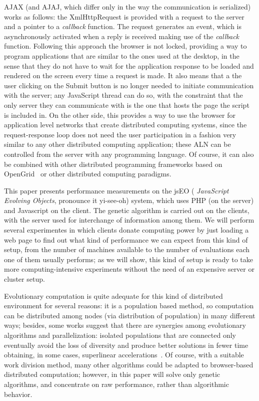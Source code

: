 \documentclass{llncs}
\begin{document}
AJAX (and AJAJ, which differ only in the way the communication is
serialized) works as follows: the {\sf XmlHttpRequest} is provided 
with a request to the server and a pointer to a {\em callback} function. 
The request generates an event, which is asynchronously activated when a
reply is received  making use of the
 {\em callback} function. 
Following this approach the browser is not locked, providing a way to
program applications that are similar to  the ones used at the
desktop, in the sense that they do not have to wait for the
application response to be loaded
and rendered on the screen every time a request is made. It also means
that a the user clicking on the {\sf Submit} button is no longer
needed to initiate communication with the server; any JavaScript
thread can do so, with the constraint that the only server they can
communicate with is the one that hosts the page the script is included
in. On the other side, this provides a way to use the browser for application
level networks that create distributed computing systems,
since the request-response loop does not need the user participation in a
fashion very similar  to any other distributed computing application;
these ALN can be controlled from the server with any programming
language. Of course, it can also be combined with other distributed
programming frameworks based on OpenGrid~\cite{ogsa} or other
distributed computing paradigms. %


This paper presents performance measurements on the jsEO ({\em
  JavaScript Evolving Objects}, pronounce it yi-see-oh) system, which uses PHP 
 (on the server) and Javascript on the client. The genetic algorithm is carried out  on the clients,
with the server used  for interchange of information among
them. We will perform several experimentes in which clients donate
computing power by just loading a web page to find out what kind of
performance we can expect from this kind of setup, from the number of
machines available to the number of evaluations each one of them
usually performs; as we will show, this kind of setup is ready to take more
computing-intensive experiments without the need of an expensive server or cluster
setup. 

Evolutionary computation is quite adequate for this
kind of distributed environment for several reasons: it is a population based method,
so computation can be distributed among nodes (via distribution of
population) in many different ways;
besides, some works suggest that there are synergies among evolutionary
algorithms and parallelization: isolated populations that are
connected only eventually avoid the loss of diversity and produce
better solutions in fewer time obtaining, in some cases, superlinear
accelerations~\cite{cantu-paz:migration-policies}. Of course, with a suitable work division method, many other algorithms
could be adapted to browser-based distributed computation; however, in
this paper will solve only genetic algorithms, and concentrate on raw
performance, rather than algorithmic behavior. 
\end{document}
